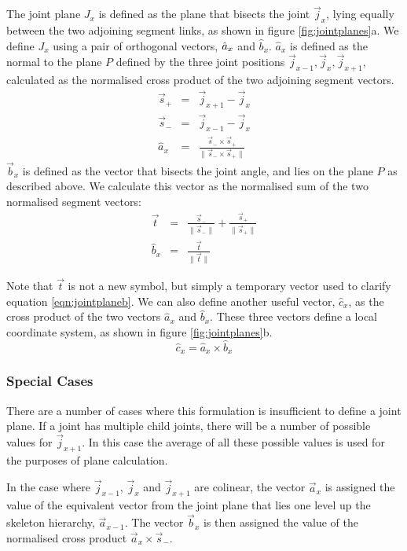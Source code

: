 The joint plane $J_x$ is defined as the plane that bisects the joint $\vec{j}_x$, lying equally between the two adjoining segment links, as shown in figure \ref{fig:jointplanes}a. We define $J_x$ using a pair of orthogonal vectors, $\hat{a}_x\symbol{normvector}$ and $\hat{b}_x$. $\hat{a}_x$ is defined as the normal to the plane $P$ defined by the three joint positions $\vec{j}_{x-1}, \vec{j}_x, \vec{j}_{x+1}$, calculated as the normalised cross product of the two adjoining segment vectors.
\begin{eqnarray}
\vec{s}_+ & = & \vec{j}_{x+1} - \vec{j}_x \\
\vec{s}_- & = & \vec{j}_{x-1} - \vec{j}_x \\
\hat{a}_x & = & \frac{\vec{s}_- \times \vec{s}_+}{\|\vec{s}_- \times \vec{s}_+\|}
\end{eqnarray}
$\vec{b}_x$ is defined as the vector that bisects the joint angle, and lies on the plane $P$ as described  above. We calculate this vector as the normalised sum of the two normalised segment vectors:
\begin{eqnarray}
\vec{t} & = & \frac{\vec{s}_-}{\|\vec{s}_-\|} + \frac{\vec{s}_+}{\|\vec{s}_+\|} \nonumber \\
\hat{b}_x & = & \frac{\vec{t}}{\|\vec{t}\|} \label{eqn:jointplaneb}
\end{eqnarray}

Note that $\vec{t}$ is not a new symbol, but simply a temporary vector used to clarify equation \ref{eqn:jointplaneb}. We can also define another useful vector, $\hat{c}_x$, as the cross product of the two vectors $\hat{a}_x$ and $\hat{b}_x$. These three vectors define a local coordinate system, as shown in figure \ref{fig:jointplanes}b.
\begin{equation}
\hat{c}_x = \hat{a}_x \times \hat{b}_x
\end{equation}

\subsubsection{\label{sec:skeletalanim:mapping:jointplanes:special}Special Cases}
There are a number of cases where this formulation is insufficient to define a joint plane. If a joint has multiple child joints, there will be a number of possible values for $\vec{j}_{x+1}$. In this case the average of all these possible values is used for the purposes of plane calculation.

In the case where $\vec{j}_{x-1}$, $\vec{j}_x$ and $\vec{j}_{x+1}$ are colinear, the vector $\vec{a}_x$ is assigned the value of the equivalent vector from the joint plane that lies one level up the skeleton hierarchy, $\vec{a}_{x-1}$. The vector $\vec{b}_x$ is then assigned the value of the normalised cross product $\vec{a}_x \times \vec{s}_-$.

